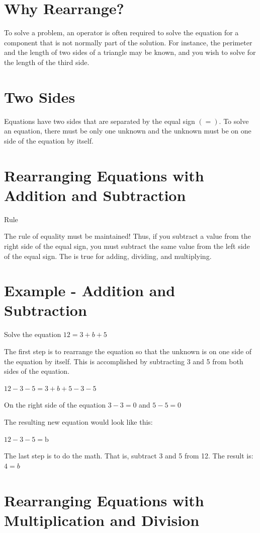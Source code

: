 \documentclass[10pt]{article}
\begin{document}
\section{Why Rearrange?}
To solve a problem, an operator is often required to solve the equation for a component that is not normally part of the solution. For instance, the perimeter and the length of two sides of a triangle may be known, and you wish to solve for the length of the third side.

\section{Two Sides}
Equations have two sides that are separated by the equal sign $(=)$. To solve an equation, there must be only one unknown and the unknown must be on one side of the equation by itself.

\section{Rearranging Equations with Addition and Subtraction}
Rule

The rule of equality must be maintained! Thus, if you subtract a value from the right side of the equal sign, you must subtract the same value from the left side of the equal sign. The is true for adding, dividing, and multiplying.

\section{Example - Addition and Subtraction}
Solve the equation $12=3+b+5$

The first step is to rearrange the equation so that the unknown is on one side of the equation by itself. This is accomplished by subtracting 3 and 5 from both sides of the equation.

$12-3-5=3+b+5-3-5$

On the right side of the equation $3-3=0$ and $5-5=0$

The resulting new equation would look like this:

$12-3-5=\mathrm{b}$

The last step is to do the math. That is, subtract 3 and 5 from 12. The result is: $4=b$

\section{Rearranging Equations with Multiplication and Division}
\end{document}
